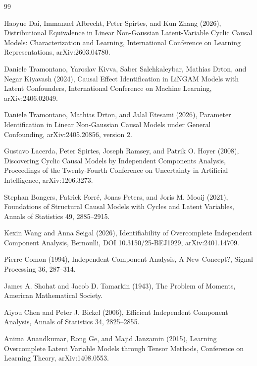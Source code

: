 \documentclass{article}
\begin{document}
\begin{thebibliography}{99}

   Haoyue Dai, Immanuel Albrecht, Peter Spirtes, and Kun Zhang (2026), Distributional Equivalence in Linear Non-Gaussian Latent-Variable Cyclic Causal Models: Characterization and Learning, International Conference on Learning Representations, arXiv:2603.04780.

   Daniele Tramontano, Yaroslav Kivva, Saber Salehkaleybar, Mathias Drton, and Negar Kiyavash (2024), Causal Effect Identification in LiNGAM Models with Latent Confounders, International Conference on Machine Learning, arXiv:2406.02049.

   Daniele Tramontano, Mathias Drton, and Jalal Etesami (2026), Parameter Identification in Linear Non-Gaussian Causal Models under General Confounding, arXiv:2405.20856, version 2.

   Gustavo Lacerda, Peter Spirtes, Joseph Ramsey, and Patrik O. Hoyer (2008), Discovering Cyclic Causal Models by Independent Components Analysis, Proceedings of the Twenty-Fourth Conference on Uncertainty in Artificial Intelligence, arXiv:1206.3273.

   Stephan Bongers, Patrick Forré, Jonas Peters, and Joris M. Mooij (2021), Foundations of Structural Causal Models with Cycles and Latent Variables, Annals of Statistics 49, 2885--2915.

   Kexin Wang and Anna Seigal (2026), Identifiability of Overcomplete Independent Component Analysis, Bernoulli, DOI 10.3150/25-BEJ1929, arXiv:2401.14709.

   Pierre Comon (1994), Independent Component Analysis, A New Concept?, Signal Processing 36, 287--314.

   James A. Shohat and Jacob D. Tamarkin (1943), The Problem of Moments, American Mathematical Society.

   Aiyou Chen and Peter J. Bickel (2006), Efficient Independent Component Analysis, Annals of Statistics 34, 2825--2855.

   Anima Anandkumar, Rong Ge, and Majid Janzamin (2015), Learning Overcomplete Latent Variable Models through Tensor Methods, Conference on Learning Theory, arXiv:1408.0553.


\end{thebibliography}
\end{document}
